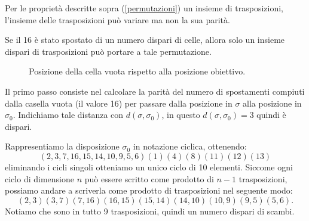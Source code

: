 Per le proprietà descritte sopra (\ref{permutazioni}) un insieme di trasposizioni, l'insieme delle trasposizioni può variare ma non la sua parità.

Se il 16 è stato spostato di un numero dispari di celle, allora solo un insieme dispari di trasposizioni può portare a tale permutazione. 

\begin{figure}[h]
    \centering
    \caption{Posizione della cella vuota rispetto alla posizione obiettivo.}
    \label{fig:notCiclica}
\end{figure}

Il primo passo consiste nel calcolare la parità del numero di spostamenti compiuti dalla casella vuota (il valore 16) per passare dalla posizione in $\sigma$ alla posizione in $\sigma_0$. Indichiamo tale distanza con $d(\sigma,\sigma_0)$, in questo $d(\sigma,\sigma_0)=3$ quindi è dispari.   

Rappresentiamo la disposizione $\sigma_0$ in notazione ciclica, ottenendo: $$(2,3,7,16,15,14,10,9,5,6)(1)(4)(8)(11)(12)(13)$$ eliminando i cicli singoli otteniamo un unico ciclo di 10 elementi. Siccome ogni ciclo di dimensione $n$ può essere scritto come prodotto di $n-1$ trasposizioni, possiamo andare a scriverla come prodotto di trasposizioni nel seguente modo:
$$
(2,3)(3,7)(7,16)(16,15)(15,14)(14,10)(10,9)(9,5)(5,6).
$$
Notiamo che sono in tutto 9 trasposizioni, quindi un numero dispari di scambi.

